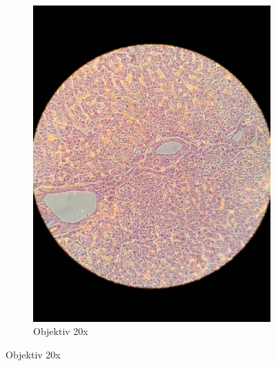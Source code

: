 \begin{figure}[h!]
\begin{subfigure}[b]{0.3\textwidth}
		\includegraphics[width=1\textwidth]{../images/05_human_liver.jpg}
		\caption{Objektiv 20x}
		\label{fig:05_human_liver}
	\end{subfigure}


\end{figure}
